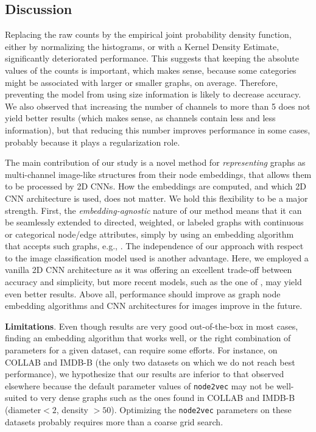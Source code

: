 \documentclass[sigconf]{acmart}
\begin{document}
\subsection{Discussion}
Replacing the raw counts by the empirical joint probability density function, either by normalizing the histograms, or with a Kernel Density Estimate, significantly deteriorated performance. This suggests that keeping the absolute values of the counts is important, which makes sense, because some categories might be associated with larger or smaller graphs, on average. Therefore, preventing the model from using size information is likely to decrease accuracy. We also observed that increasing the number of channels to more than 5 does not yield better results (which makes sense, as channels contain less and less information), but that reducing this number improves performance in some cases, probably because it plays a regularization role.

The main contribution of our study is a novel method for \textit{representing} graphs as multi-channel image-like structures from their node embeddings, that allows them to be processed by 2D CNNs. How the embeddings are computed, and which 2D CNN architecture is used, does not matter. We hold this flexibility to be a major strength. First, the \textit{embedding-agnostic} nature of our method means that it can be seamlessly extended to directed, weighted, or labeled graphs with continuous or categorical node/edge attributes, simply by using an embedding algorithm that accepts such graphs, e.g., \citep{liao2017attributed}. The independence of our approach with respect to the image classification model used is another advantage. Here, we employed a vanilla 2D CNN architecture as it was offering an excellent trade-off between accuracy and simplicity, but more recent models, such as the one of \cite{huang2016densely}, may yield even better results. Above all, performance should improve as graph node embedding algorithms and CNN architectures for images improve in the future.

\textbf{Limitations}. Even though results are very good out-of-the-box in most cases, finding an embedding algorithm that works well, or the right combination of parameters for a given dataset, can require some efforts. For instance, on COLLAB and IMDB-B (the only two datasets on which we do not reach best performance), we hypothesize that our results are inferior to that observed elsewhere because the default parameter values of \texttt{node2vec} may not be well-suited to very dense graphs such as the ones found in COLLAB and IMDB-B (diameter$<2$, density $>50$). Optimizing the \texttt{node2vec} parameters on these datasets probably requires more than a coarse grid search. 
\end{document}
